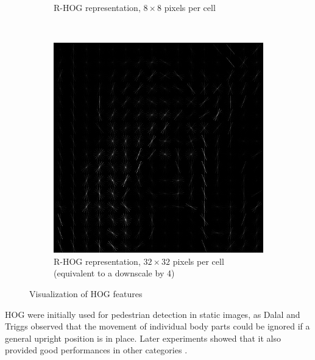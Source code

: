 \begin{figure}[h]
\begin{subfigure}[t]{0.3\textwidth}
        \caption{\acs{R-HOG} representation, $8\times8$ pixels per cell}
        \label{fig:lena_hog:8x8}
    \end{subfigure}
    ~
    \begin{subfigure}[t]{0.3\textwidth}
        \includegraphics[width=\textwidth]{images/lena_hog_32x32}
        \caption{\acs{R-HOG} representation, $32\times32$ pixels per cell (equivalent to a downscale by 4)}
        \label{fig:lena_hog:32x32}
    \end{subfigure}
    \caption{Visualization of \ac{HOG} features}
    \label{fig:lena_hog}
\end{figure}

\ac{HOG} were initially used for pedestrian detection in static images, as Dalal and Triggs observed that the movement of individual body parts could be ignored if a general upright position is in place. Later experiments showed that it also provided good performances in other categories \cite{Malisiewicz2011}.
